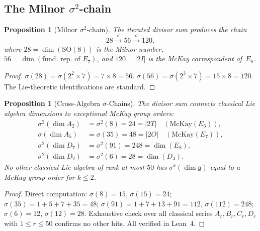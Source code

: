 \documentclass[11pt]{amsart}
\theoremstyle{plain}
\newtheorem{proposition}[theorem]{Proposition}
\theoremstyle{definition}
\theoremstyle{remark}
\newcommand{\fg}{\mathfrak{g}}
\begin{document}
\subsection{The Milnor $\sigma^2$-chain}

\begin{proposition}[Milnor $\sigma^2$-chain]\label{prop:milnor-chain}
The iterated divisor sum produces the chain
\[
  28 \xrightarrow{\;\sigma\;} 56 \xrightarrow{\;\sigma\;} 120,
\]
where $28 = \dim(\mathrm{SO}(8))$ is the Milnor number, $56 = \dim(\text{fund.\ rep.\ of } E_7)$,
and $120 = |2I|$ is the McKay correspondent of~$E_8$.
\end{proposition}

\begin{proof}
$\sigma(28) = \sigma(2^2 \times 7) = 7 \times 8 = 56$.
$\sigma(56) = \sigma(2^3 \times 7) = 15 \times 8 = 120$.
The Lie-theoretic identifications are standard.
\end{proof}

\begin{proposition}[Cross-Algebra $\sigma$-Chains]\label{prop:sigma-cross}
The divisor sum connects classical Lie algebra dimensions to exceptional
McKay group orders:
\begin{align*}
  \sigma^2(\dim A_2) &= \sigma^2(8) = 24 = |2T| \quad (\text{McKay}(E_6)), \\
  \sigma(\dim A_5) &= \sigma(35) = 48 = |2O| \quad (\text{McKay}(E_7)), \\
  \sigma^2(\dim D_7) &= \sigma^2(91) = 248 = \dim(E_8), \\
  \sigma^2(\dim D_2) &= \sigma^2(6) = 28 = \dim(D_4).
\end{align*}
No other classical Lie algebra of rank at most $50$ has
$\sigma^k(\dim\fg)$ equal to a McKay group order for $k \le 2$.
\end{proposition}

\begin{proof}
Direct computation: $\sigma(8) = 15$, $\sigma(15) = 24$;
$\sigma(35) = 1 + 5 + 7 + 35 = 48$;
$\sigma(91) = 1 + 7 + 13 + 91 = 112$, $\sigma(112) = 248$;
$\sigma(6) = 12$, $\sigma(12) = 28$.
Exhaustive check over all classical series $A_r, B_r, C_r, D_r$ with
$1 \le r \le 50$ confirms no other hits.
All verified in Lean~4.
\end{proof}
\end{document}
